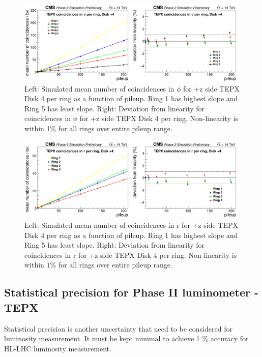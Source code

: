 \begin{figure}[H]
  \centering
  \includegraphics[width=1\columnwidth]{./coincidencesinphiperringD+4.png}
  \caption{Left: Simulated mean number of coincidences in $\phi$ for +z side TEPX Disk 4 per ring as a function of pileup. Ring 1 has highest slope and Ring 5 has least slope. Right: Deviation from linearity for coincidences in $\phi$ for +z side TEPX Disk 4 per ring. Non-linearity is within 1\% for all rings over entire pileup range.}
  \label{fig:CMS}
\end{figure}





\begin{figure}[H]
  \centering
  \includegraphics[width=1\columnwidth]{./coincidencesinrperringD+4.png}
  \caption{Left: Simulated mean number of coincidences in r for +z side TEPX Disk 4 per ring as a function of pileup. Ring 1 has highest slope and Ring 5 has least slope. Right: Deviation from linearity for coincidences in r for +z side TEPX Disk 4 per ring. Non-linearity is within $1\%$ for all rings over entire pileup range.}
  \label{fig:CMS}
\end{figure}

\subsection{Statistical precision for Phase II luminometer - TEPX}
Statistical precision is another uncertainty that need to be considered for luminosity measurement. It must be kept minimal to achieve 1 $\%$ accuracy for HL-LHC luminosity measurement. \\


